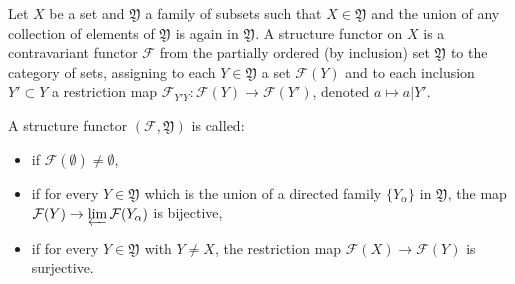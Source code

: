 Let $X$ be a set and $\mathfrak{Y}$ a family of subsets such that $X \in \mathfrak{Y}$ and the union of any collection of elements of $\mathfrak{Y}$ is again in $\mathfrak{Y}$. A structure functor on $X$ is a contravariant functor $\mathcal{F}$ from the partially ordered (by inclusion) set $\mathfrak{Y}$ to the category of sets, assigning to each $Y \in \mathfrak{Y}$ a set $\mathcal{F}(Y)$ and to each inclusion $Y' \subset Y$ a restriction map $\mathcal{F}_{Y'Y} \colon \mathcal{F}(Y) \to \mathcal{F}(Y')$, denoted $a \mapsto a|Y'$.

A structure functor $(\mathcal{F}, \mathfrak{Y})$ is called:
\begin{itemize}
\item {} if $\mathcal{F}(\emptyset) \neq \emptyset$,
\item {} if for every $Y \in \mathfrak{Y}$ which is the union of a directed family $\{Y_\alpha\}$ in $\mathfrak{Y}$, the map $\mathcal{F}(Y) \to \varprojlim \mathcal{F}(Y_\alpha)$ is bijective,
\item {} if for every $Y \in \mathfrak{Y}$ with $Y \neq X$, the restriction map $\mathcal{F}(X) \to \mathcal{F}(Y)$ is surjective.
\end{itemize}
